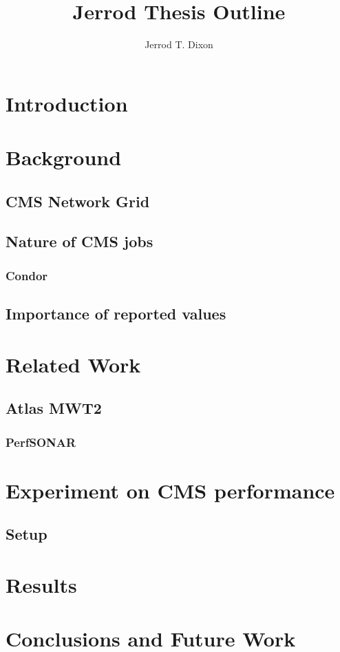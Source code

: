 \documentclass[]{article}
\title{Jerrod Thesis Outline}
\author{Jerrod T. Dixon}
\begin{document}
\maketitle

\section{Introduction}

\section{Background}
\subsection{CMS Network Grid}
\subsection{Nature of CMS jobs}
\subsubsection{Condor}
\subsection{Importance of reported values}
\section{Related Work}
\subsection{Atlas MWT2}
\subsubsection{PerfSONAR}
\section{Experiment on CMS performance}
\subsection{Setup}
\section{Results}

\section{Conclusions and Future Work}
\end{document}
